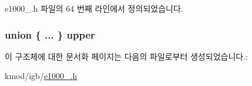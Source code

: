 e1000\+\_.\+h 파일의 64 번째 라인에서 정의되었습니다.

\subsubsection[{\texorpdfstring{upper}{upper}}]{\setlength{\rightskip}{0pt plus 5cm}union \{ ... \}   upper}\hypertarget{structe1000__adv__data__desc_ad7daa4f748cda2aa3dcecb55e27ed121}{}\label{structe1000__adv__data__desc_ad7daa4f748cda2aa3dcecb55e27ed121}


이 구조체에 대한 문서화 페이지는 다음의 파일로부터 생성되었습니다.\+:\begin{DoxyCompactItemize}
\item 
kmod/igb/\hyperlink{kmod_2igb_2e1000__82575_8h}{e1000\+\_.\+h}\end{DoxyCompactItemize}
